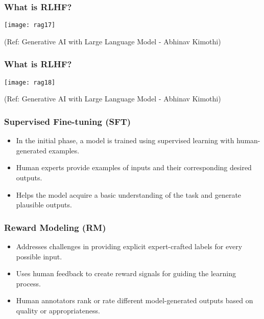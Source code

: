 \begin{frame}[fragile]\frametitle{What is RLHF?}


		\begin{center}
		\texttt{[image: rag17]}
		\end{center}

{\tiny (Ref: Generative AI with Large Language Model - Abhinav  Kimothi)}

\end{frame}


\begin{frame}[fragile]\frametitle{What is RLHF?}


		\begin{center}
		\texttt{[image: rag18]}
		\end{center}

{\tiny (Ref: Generative AI with Large Language Model - Abhinav  Kimothi)}

\end{frame}



\begin{frame}[fragile]\frametitle{Supervised Fine-tuning (SFT)}
\begin{itemize}
    \item In the initial phase, a model is trained using supervised learning with human-generated examples.
    \item Human experts provide examples of inputs and their corresponding desired outputs.
    \item Helps the model acquire a basic understanding of the task and generate plausible outputs.
\end{itemize}
\end{frame}



\begin{frame}[fragile]\frametitle{Reward Modeling (RM)}
\begin{itemize}
    \item Addresses challenges in providing explicit expert-crafted labels for every possible input.
    \item Uses human feedback to create reward signals for guiding the learning process.
    \item Human annotators rank or rate different model-generated outputs based on quality or appropriateness.
\end{itemize}
\end{frame}

